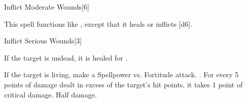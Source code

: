 \begin{spellsection}[Mass]{Inflict Moderate Wounds}[6]
    \begin{spellheader}
    \end{spellheader}
    \begin{spellcontent}
        \begin{spelltargetinginfo}
        \end{spelltargetinginfo}
        \begin{spelleffects}
            \spellspecial This spell functions like , except that it heals or inflicts [d6].
        \end{spelleffects}
    \end{spellcontent}
    \begin{spellfooter}
        \miscastexplode
    \end{spellfooter}
\end{spellsection}

\begin{spellsection}{Inflict Serious Wounds}[3]
    \begin{spellheader}
    \end{spellheader}
    \begin{spellcontent}
        \begin{spelltargetinginfo}
        \end{spelltargetinginfo}
        \begin{spelleffects}
            \spelleffect If the target is undead, it is healed for .
            \begin{spellattacktriggered}{If the target is living, make a Spellpower vs. Fortitude attack.}
                \spellsuccess {}. For every 5 points of damage dealt in excess of the target's hit points, it takes 1 point of critical damage.
                \spellfailure Half damage.
            \end{spellattacktriggered}
        \end{spelleffects}
    \end{spellcontent}
    \begin{spellfooter}
        \miscastrandom
    \end{spellfooter}
\end{spellsection}

